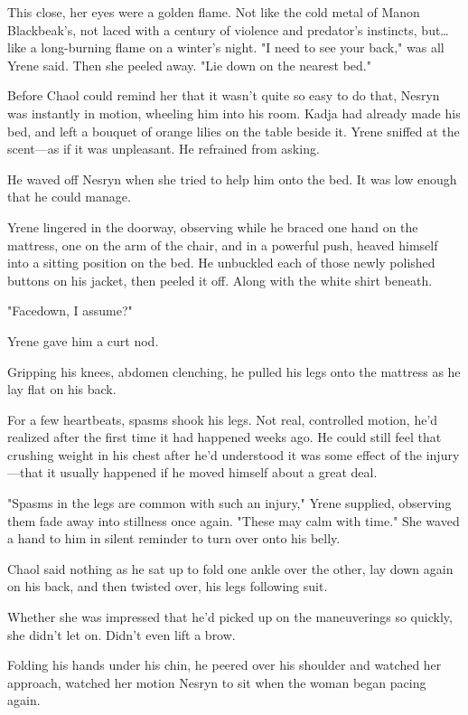 This close, her eyes were a golden flame.
Not like the cold metal of Manon Blackbeak's, not laced with a century of violence and predator's instincts, but\ldots like a long-burning flame on a winter's night.
"I need to see your back," was all Yrene said.
Then she peeled away.
"Lie down on the nearest bed."

Before Chaol could remind her that it wasn't quite so easy to do that, Nesryn was instantly in motion, wheeling him into his room.
Kadja had already made his bed, and left a bouquet of orange lilies on the table beside it.
Yrene sniffed at the scent---as if it was unpleasant.
He refrained from asking.

He waved off Nesryn when she tried to help him onto the bed.
It was low enough that he could manage.

Yrene lingered in the doorway, observing while he braced one hand on the mattress, one on the arm of the chair, and in a powerful push, heaved himself into a sitting position on the bed.
He unbuckled each of those newly polished buttons on his jacket, then peeled it off.
Along with the white shirt beneath.

"Facedown, I assume?"

Yrene gave him a curt nod.

Gripping his knees, abdomen clenching, he pulled his legs onto the mattress as he lay flat on his back.

For a few heartbeats, spasms shook his legs.
Not real, controlled motion, he'd realized after the first time it had happened weeks ago.
He could still feel that crushing weight in his chest after he'd understood it was some effect of the injury---that it usually happened if he moved himself about a great deal.

"Spasms in the legs are common with such an injury," Yrene supplied, observing them fade away into stillness once again.
"These may calm with time."
She waved a hand to him in silent reminder to turn over onto his belly.

Chaol said nothing as he sat up to fold one ankle over the other, lay down again on his back, and then twisted over, his legs following suit.

Whether she was impressed that he'd picked up on the maneuverings so quickly, she didn't let on.
Didn't even lift a brow.

Folding his hands under his chin, he peered over his shoulder and watched her approach, watched her motion Nesryn to sit when the woman began pacing again.

